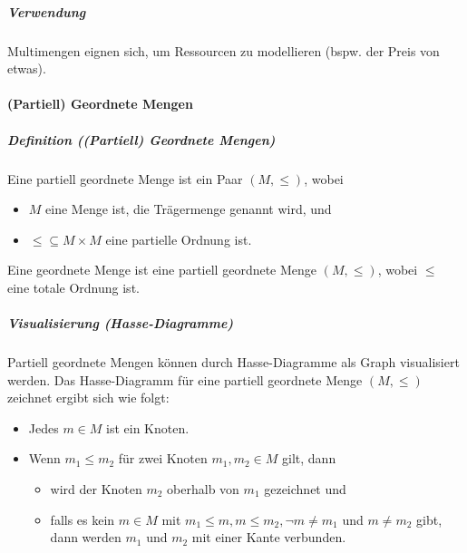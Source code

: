\documentclass[a4paper, 11pt, accentcolor = tud3b]{tudreport}
\newcommand{\definition}[2]{\subparagraph{Definition (#1)} #2}
\begin{document}
			    \subparagraph{Verwendung}
			    Multimengen eignen sich, um Ressourcen zu modellieren (bspw. der Preis von etwas).
		    
		    \paragraph{(Partiell) Geordnete Mengen}
			    \definition{(Partiell) Geordnete Mengen}{
				    Eine partiell geordnete Menge ist ein Paar $ (M, \leq) $, wobei
				    \begin{itemize}
				    	\item $ M $ eine Menge ist, die Trägermenge genannt wird, und
				    	\item $ \leq \subseteq M \times M $ eine partielle Ordnung ist.
				    \end{itemize}
				    Eine geordnete Menge ist eine partiell geordnete Menge $ (M, \leq) $, wobei $ \leq $ eine totale Ordnung ist.
				}
			    
			    \subparagraph{Visualisierung (Hasse-Diagramme)}
			    Partiell geordnete Mengen können durch Hasse-Diagramme als Graph visualisiert werden. Das Hasse-Diagramm für eine partiell geordnete Menge $ (M, \leq) $ zeichnet ergibt sich wie folgt:
			    \begin{itemize}
			    	\item Jedes $ m \in M $ ist ein Knoten.
			    	\item Wenn $ m _ 1 \leq m _ 2 $ für zwei Knoten $ m _ 1, m _ 2 \in M $ gilt, dann
				    	\begin{itemize}
				    		\item wird der Knoten $ m _ 2 $ oberhalb von $ m _ 1 $ gezeichnet und
				    		\item falls es kein $ m \in M $ mit $ m _ 1 \leq m, m \leq m _ 2, \lnot m \neq m _ 1 $ und $ m \neq m _ 2 $ gibt, dann werden $ m _ 1 $ und $ m _ 2 $ mit einer Kante verbunden.
				    	\end{itemize}
			    \end{itemize}
		    
\end{document}
